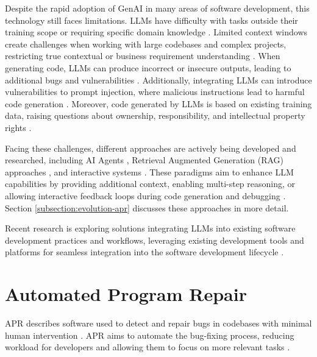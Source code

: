 Despite the rapid adoption of \ac{GenAI} in many areas of software development, this technology still faces limitations. \acp{LLM} have difficulty with tasks outside their training scope or requiring specific domain knowledge \cite{houLargeLanguageModels2024}. Limited context windows create challenges when working with large codebases and complex projects, restricting true contextual or business requirement understanding \cite{bhargavmallampatiRoleGenerativeAI2025}. When generating code, \acp{LLM} can produce incorrect or insecure outputs, leading to additional bugs and vulnerabilities \cite{houLargeLanguageModels2024, bhargavmallampatiRoleGenerativeAI2025}. Additionally, integrating \acp{LLM} can introduce vulnerabilities to prompt injection, where malicious instructions lead to harmful code generation \cite{liuPromptInjectionAttack2024}. Moreover, code generated by \acp{LLM} is based on existing training data, raising questions about ownership, responsibility, and intellectual property rights \cite{sauvolaFutureSoftwareDevelopment2024, houLargeLanguageModels2024}.

Facing these challenges, different approaches are actively being developed and researched, including AI Agents \cite{liuMarsCodeAgentAInative2024, yangSWEagentAgentComputerInterfaces2024}, Retrieval Augmented Generation (RAG) approaches \cite{xiaAgentlessDemystifyingLLMbased2024}, and interactive systems \cite{xiaAutomatedProgramRepair2024}. These paradigms aim to enhance LLM capabilities by providing additional context, enabling multi-step reasoning, or allowing interactive feedback loops during code generation and debugging \cite{houLargeLanguageModels2024, puvvadiCodingAgentsComprehensive2025}. Section \ref{subsection:evolution-apr} discusses these approaches in more detail.

Recent research is exploring solutions integrating \acp{LLM} into existing software development practices and workflows, leveraging existing development tools and platforms for seamless integration into the software development lifecycle \cite{puvvadiCodingAgentsComprehensive2025, dohmkeGitHubCopilotMeet2025, IntroducingCodex, sauvolaFutureSoftwareDevelopment2024}.

\section{Automated Program Repair}

\acf{APR} describes software used to detect and repair bugs in codebases with minimal human intervention \cite{zhangSurveyLearningbasedAutomated2024}. APR aims to automate the bug-fixing process, reducing workload for developers and allowing them to focus on more relevant tasks \cite{houLargeLanguageModels2024}.

